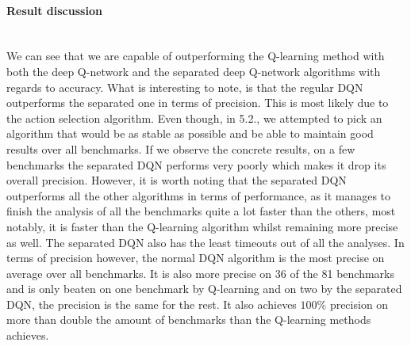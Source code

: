 \paragraph{Result discussion}\mbox{}\\
We can see that we are capable of outperforming the Q-learning method with both the deep Q-network and the separated deep Q-network algorithms with regards to accuracy. What is interesting to note, is that the regular DQN outperforms the separated one in terms of precision. This is most likely due to the action selection algorithm. Even though, in 5.2., we attempted to pick an algorithm that would be as stable as possible and be able to maintain good results over all benchmarks. If we observe the concrete results, on a few benchmarks the separated DQN performs very poorly which makes it drop its overall precision. However, it is worth noting that the separated DQN outperforms all the other algorithms in terms of performance, as it manages to finish the analysis of all the benchmarks quite a lot faster than the others, most notably, it is faster than the Q-learning algorithm whilst remaining more precise as well. The separated DQN also has the least timeouts out of all the analyses. In terms of precision however, the normal DQN algorithm is the most precise on average over all benchmarks. It is also more precise on 36 of the 81 benchmarks and is only beaten on one benchmark by Q-learning and on two by the separated DQN, the precision is the same for the rest. It also achieves $100\%$ precision on more than double the amount of benchmarks than the Q-learning methods achieves.
































